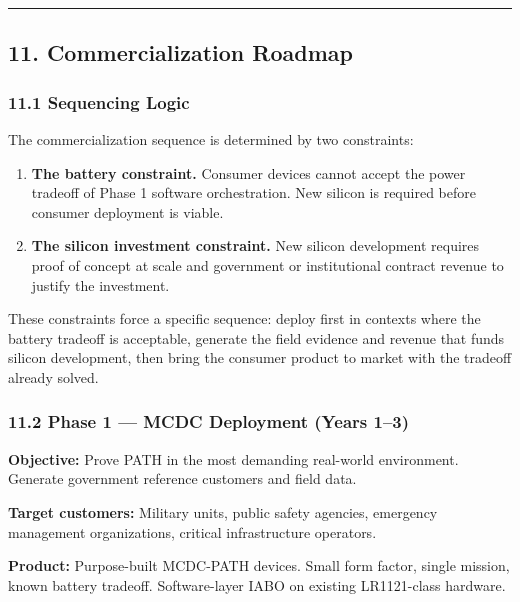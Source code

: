 \documentclass[
  11pt,
]{article}
\providecommand{\tightlist}{%
  \setlength{\itemsep}{0pt}\setlength{\parskip}{0pt}}
\begin{document}
\begin{center}\rule{0.5\linewidth}{0.5pt}\end{center}

\hypertarget{commercialization-roadmap}{%
\subsection{11. Commercialization
Roadmap}\label{commercialization-roadmap}}

\hypertarget{sequencing-logic}{%
\subsubsection{11.1 Sequencing Logic}\label{sequencing-logic}}

The commercialization sequence is determined by two constraints:

\begin{enumerate}
\def\labelenumi{\arabic{enumi}.}
\tightlist
\item
  \textbf{The battery constraint.} Consumer devices cannot accept the
  power tradeoff of Phase 1 software orchestration. New silicon is
  required before consumer deployment is viable.
\item
  \textbf{The silicon investment constraint.} New silicon development
  requires proof of concept at scale and government or institutional
  contract revenue to justify the investment.
\end{enumerate}

These constraints force a specific sequence: deploy first in contexts
where the battery tradeoff is acceptable, generate the field evidence
and revenue that funds silicon development, then bring the consumer
product to market with the tradeoff already solved.

\hypertarget{phase-1-mcdc-deployment-years-13}{%
\subsubsection{11.2 Phase 1 --- MCDC Deployment (Years
1--3)}\label{phase-1-mcdc-deployment-years-13}}

\textbf{Objective:} Prove PATH in the most demanding real-world
environment. Generate government reference customers and field data.

\textbf{Target customers:} Military units, public safety agencies,
emergency management organizations, critical infrastructure operators.

\textbf{Product:} Purpose-built MCDC-PATH devices. Small form factor,
single mission, known battery tradeoff. Software-layer IABO on existing
LR1121-class hardware.
\end{document}
